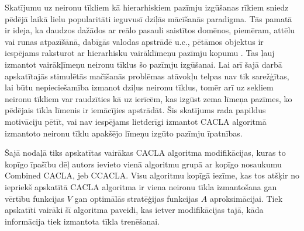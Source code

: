 \documentclass{ludis} %
\begin{document}
Skatījumu uz neironu tīkliem kā hierarhiskiem pazīmju izgūšanas rīkiem sniedz
pēdējā laikā lielu popularitāti ieguvusī dziļās mācīšanās paradigma. Tās pamatā
ir ideja, ka daudzos dažādos ar reālo pasauli saistītos domēnos, piemēram, attēlu
vai runas atpazīšānā, dabīgās valodas apstrādē u.c., pētāmos objektus ir
iespējams raksturot ar hierarhisku vairāklīmeņu pazīmju kopumu \autocite{Lecun2015}. Tas ļauj
izmantot vairākļīmeņu neironu tīklus šo pazīmju izgūšanai. %
Lai arī šajā darbā apskatītajās stimulētās mačīšanās problēmas atāvokļu telpas
nav tik sarežģītas, lai būtu nepieciešamība izmanot dziļus neironu tīklus, tomēr
arī uz sekliem neironu tīkliem var raudzīties kā uz ierīcēm, kas izgūst zema
līmeņa pazīmes, ko pēdējais tīkla līmenis ir iemācījies apstrādāt. Šis skatījums
rada papildus motivāciju pētīt, vai nav iespējams lietderīgi izmantot CACLA
algoritmā izmantoto neironu tīklu apakšējo līmeņu izgūto pazīmju īpatnības.

Šajā nodaļā tiks apskatītas vairākas CACLA algoritma modifikācijas, kuras to
kopīgo īpašību dēļ autors ievieto vienā algoritmu grupā ar kopīgo nosaukumu
Combined CACLA, jeb CCACLA. Visu algoritmu kopīgā iezīme, kas tos atšķir no
iepriekš apskatītā CACLA algoritma ir viena neironu tīkla izmantošana gan
vērtību funkcijas $V$ gan optimālās stratēģijas funkcijas $A$ aproksimācijai.
Tiek apskatīti vairāki šī algoritma paveidi, kas ietver modifikācijas tajā, kāda
informācija tiek izmantota tīkla trenēšanai.

\end{document}
